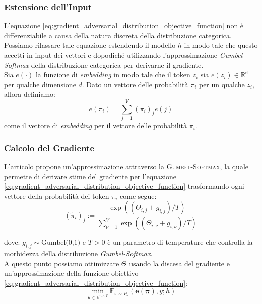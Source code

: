 \subsubsection{Estensione dell'Input}
L'equazione \ref{eq:gradient_adversarial_distribution_objective_function} non \`e differenziabile a causa della natura discreta della distribuzione categorica. Possiamo rilassare tale equazione estendendo il modello \(h\) in modo tale che questo accetti in input dei vettori e dopodich\'e utilizzando l'approssimazione \emph{Gumbel-Softmax} della distribuzione categorica per derivarne il gradiente.\\
Sia \(e(\cdot)\) la funzione di \emph{embedding} in modo tale che il token \(z_i\) sia \(e(z_i)\in\mathbb{R^d}\) per qualche dimensione \(d\). Dato un vettore delle probabilit\`a \(\pi_i\) per un qualche \(z_i\), allora definiamo:
\begin{equation} 
e(\pi_i) = \sum_{j=1}^V (\pi_i)_j e(j)
\end{equation}
come il vettore di \emph{embedding} per il vettore delle probabilit\`a \(\pi_i\).

\subsubsection{Calcolo del Gradiente}
L'articolo \cite{guo2021gradientbasedadversarialattackstext} propone un'approssimazione attraverso la \textsc{Gumbel-Softmax}, la quale permette di derivare stime del gradiente per l'equazione \ref{eq:gradient_adversarial_distribution_objective_function} trasformando ogni vettore della probabilit\`a dei token \(\pi_i\) come segue:
\begin{equation}
(\tilde{\pi}_i)_j := \frac{\exp((\Theta_{i,j} + g_{i,j})/T)}{\sum_{\nu=1}^V \exp((\Theta_{i,\nu} + g_{i,\nu})/T)}
\end{equation}

dove:
\(g_{i,j}\sim\text{Gumbel(0,1)} \text{ e } T>0\) \`e un parametro di temperature che controlla la morbidezza della distribuzione \emph{Gumbel-Softmax}.\\
A questo punto possiamo ottimizzare \(\Theta\) usando la discesa del gradiente e un'approssimazione della funzione obiettivo \ref{eq:gradient_adversarial_distribution_objective_function}:
\begin{equation} 
\min_{\theta \in \mathbb{R}^{n \times V}} \mathbb{E}_{\pi \sim P_{\theta}}(\boldsymbol{e}(\boldsymbol{\pi}), y; h)
\end{equation}

